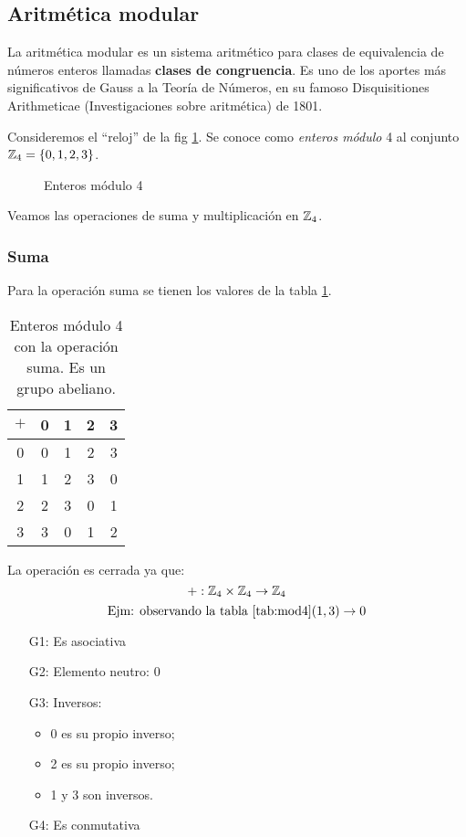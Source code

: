 \subsection{Aritmética modular} \label{sec:aritmod}

La aritmética modular es un sistema aritmético para clases de equivalencia de números enteros llamadas \textbf{clases de congruencia}. Es uno de los aportes más significativos de Gauss a la Teoría de Números, en su famoso Disquisitiones Arithmeticae (Investigaciones sobre aritmética) de 1801.

Consideremos el ``reloj'' de la fig \ref{fig:relojMod3}. Se conoce como \textit{enteros módulo} 4 al conjunto $\mathbb{Z}_4 = \{ 0, 1, 2, 3 \}$.
\begin{figure}[h]
	\centering
	
	\caption{Enteros módulo 4}
	\label{fig:relojMod3}
\end{figure}

Veamos las operaciones de suma y multiplicación en $\mathbb{Z}_4$.

\subsubsection{Suma}

Para la operación suma se tienen los valores de la tabla \ref{tab:mod4}.
\begin{table}[h]
	\centering
	\begin{tabular}{c|cccc}
		$+$ & 0 & 1 & 2 & 3\\
		\hline
		0 & 0 & 1 & 2 & 3\\
		1 & 1 & 2 & 3 & 0\\
		2 & 2 & 3 & 0 & 1\\
		3 & 3 & 0 & 1 & 2\\
	\end{tabular}
	\caption{Enteros módulo 4 con la operación suma. Es un grupo abeliano.}
	\label{tab:mod4}
\end{table}

La operación es cerrada ya que:
\[ +: \mathbb{Z}_4 \times \mathbb{Z}_4 \rightarrow \mathbb{Z}_4  \]
\[ \mbox{Ejm: observando la tabla \ref{tab:mod4}} (1,3) \rightarrow 0 \]

\begin{itemize}
	\item[G1:] Es asociativa \cmark
	\item[G2:] Elemento neutro: 0 \cmark
	\item[G3:] Inversos: \cmark  \begin{itemize}
		\item 0 es su propio inverso;
		\item 2 es su propio inverso;
		\item 1 y 3 son inversos.
	\end{itemize}
	\item[G4:] Es conmutativa \cmark
\end{itemize}

